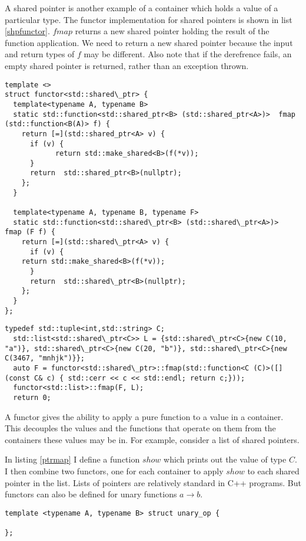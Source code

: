 \documentclass[12pt,fleqn]{article}
\begin{document}
A shared pointer is another example of a container which holds a value of a particular type.
The functor implementation for shared pointers is shown in list \ref{shpfunctor}. 
$fmap$ returns a new shared pointer holding the result of the function application.
We need to return a new shared pointer because the input and return types of $f$ may be different. 
Also note that if the derefrence fails, an empty shared pointer is returned, rather than an exception thrown.
\begin{lstlisting}[caption=shared pointer as container, label=shpfunctor]
template <>
struct functor<std::shared\_ptr> {
  template<typename A, typename B>
  static std::function<std::shared_ptr<B> (std::shared_ptr<A>)>  fmap (std::function<B(A)> f) {
    return [=](std::shared_ptr<A> v) {
      if (v) {
	        return std::make_shared<B>(f(*v)); 
      }
      return  std::shared_ptr<B>(nullptr);
    };
  }

  template<typename A, typename B, typename F>
  static std::function<std::shared\_ptr<B> (std::shared\_ptr<A>)>  fmap (F f) {
    return [=](std::shared\_ptr<A> v) {
      if (v) {
	return std::make_shared<B>(f(*v)); 
      }
      return  std::shared\_ptr<B>(nullptr);
    };
  }
};
\end{lstlisting}
\begin{lstlisting}[caption=mapping over a list of shared pointers, label=ptrmap]
  typedef std::tuple<int,std::string> C;
  std::list<std::shared\_ptr<C>> L = {std::shared\_ptr<C>{new C(10, "a")}, std::shared\_ptr<C>{new C(20, "b")}, std::shared\_ptr<C>{new C(3467, "mnhjk")}};
  auto F = functor<std::shared\_ptr>::fmap(std::function<C (C)>([](const C& c) { std::cerr << c << std::endl; return c;}));
  functor<std::list>::fmap(F, L);
  return 0;
\end{lstlisting}

A functor gives the ability to apply a pure function to a value in a container.
This decouples the values and the functions that operate on them from the containers these values may be in.
For example, consider a list of shared pointers.

In listing \ref{ptrmap} I define a function $show$ which prints out the value of type $C$. I then combine two functors, one for each container to apply $show$ 
to each shared pointer in the list.
Lists of pointers are relatively standard in C++ programs. But functors can also be defined for unary functions $a \rightarrow b$.

\begin{lstlisting}[caption=unary operator, label=unop]
template <typename A, typename B> struct unary_op {
  
};
\end{lstlisting}
\end{document}
